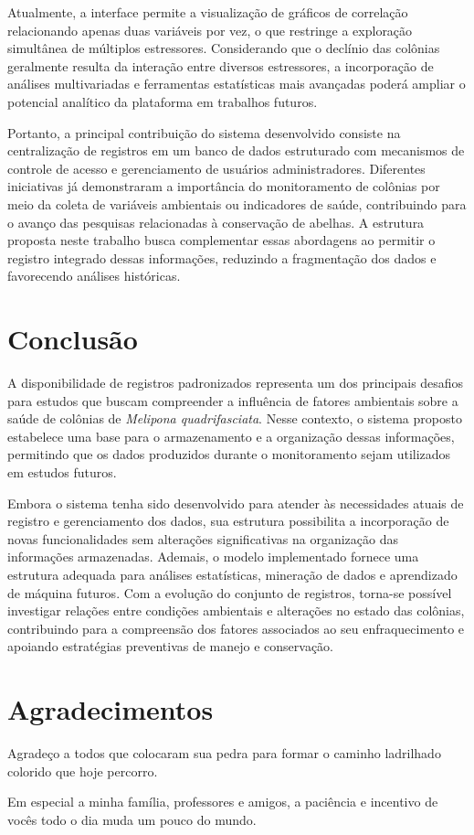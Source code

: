 \documentclass[12pt]{unisenaiclass}
\begin{document}
Atualmente, a interface permite a visualização de gráficos de correlação relacionando apenas duas variáveis por vez, o que restringe a exploração simultânea de múltiplos estressores. Considerando que o declínio das colônias geralmente resulta da interação entre diversos estressores, a incorporação de análises multivariadas e ferramentas estatísticas mais avançadas poderá ampliar o potencial analítico da plataforma em trabalhos futuros.

Portanto, a principal contribuição do sistema desenvolvido consiste na centralização de registros em um banco de dados estruturado com mecanismos de controle de acesso e gerenciamento de usuários administradores. Diferentes iniciativas já demonstraram a importância do monitoramento de colônias por meio da coleta de variáveis ambientais ou indicadores de saúde, contribuindo para o avanço das pesquisas relacionadas à conservação de abelhas. A estrutura proposta neste trabalho busca complementar essas abordagens ao permitir o registro integrado dessas informações, reduzindo a fragmentação dos dados e favorecendo análises históricas.

\section{Conclusão}
A disponibilidade de registros padronizados representa um dos principais desafios para estudos que buscam compreender a influência de fatores ambientais sobre a saúde de colônias de \textit{Melipona quadrifasciata}. Nesse contexto, o sistema proposto estabelece uma base para o armazenamento e a organização dessas informações, permitindo que os dados produzidos durante o monitoramento sejam utilizados em estudos futuros.

Embora o sistema tenha sido desenvolvido para atender às necessidades atuais de registro e gerenciamento dos dados, sua estrutura possibilita a incorporação de novas funcionalidades sem alterações significativas na organização das informações armazenadas. Ademais, o modelo implementado fornece uma estrutura adequada para análises estatísticas, mineração de dados e aprendizado de máquina futuros. Com a evolução do conjunto de registros, torna-se possível investigar relações entre condições ambientais e alterações no estado das colônias, contribuindo para a compreensão dos fatores associados ao seu enfraquecimento e apoiando estratégias preventivas de manejo e conservação.

\section*{Agradecimentos}
Agradeço a todos que colocaram sua pedra para formar o caminho ladrilhado colorido que hoje percorro.

Em especial a minha família, professores e amigos, a paciência e incentivo de vocês todo o dia muda um pouco do mundo.


\end{document}
